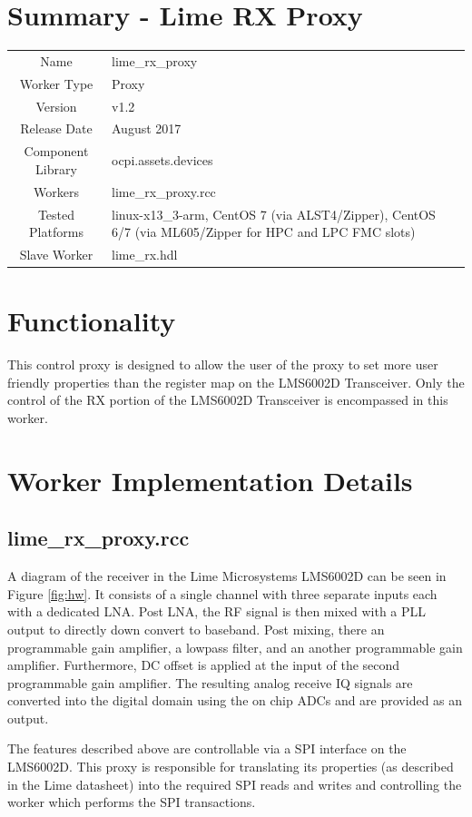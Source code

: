 \documentclass{article}
\author{} %
\date{Version \docVersion} %
\title{\docTitle}
\def\docVersion{1.2}
\def\comp{lime\_rx\_proxy}
\def\Comp{Lime RX Proxy}
\begin{document}
\section*{Summary - \Comp}
\begin{tabular}{|c|M{13.5cm}|}
	\hline
	                  &                \\
	\hline
	Name              & \comp          \\
	\hline
	Worker Type       & Proxy          \\
	\hline
	Version           & v\docVersion \\
	\hline
	Release Date      & August 2017 \\
	\hline
	Component Library & ocpi.assets.devices   \\
	\hline
	Workers           & \comp.rcc      \\
	\hline
	Tested Platforms  & linux-x13\_3-arm, CentOS 7 (via ALST4/Zipper), CentOS 6/7 (via ML605/Zipper for HPC and LPC FMC slots) \\
	\hline
	Slave Worker      & lime\_rx.hdl   \\
	\hline
\end{tabular}

\section*{Functionality}
This control proxy is designed to allow the user of the proxy to set more user friendly properties than the register map on the LMS6002D Transceiver.  Only the control of the RX portion of the LMS6002D Transceiver is encompassed in this worker.

\section*{Worker Implementation Details}
\subsection*{\comp.rcc}
A diagram of the receiver in the Lime Microsystems LMS6002D can be seen in Figure \ref{fig:hw}. It consists of a single channel with three separate inputs each with a dedicated LNA. Post LNA, the RF signal is then mixed with a PLL output to directly down convert to baseband. Post mixing, there an programmable gain amplifier, a lowpass filter, and an another programmable gain amplifier. Furthermore, DC offset is applied at the input of the second programmable gain amplifier. The resulting analog receive IQ signals are converted into the digital domain using the on chip ADCs and are provided as an output.\par\medskip
\noindent The features described above are controllable via a SPI interface on the LMS6002D. This proxy is responsible for translating its properties (as described in the Lime datasheet) into the required SPI reads and writes and controlling the worker which performs the SPI transactions.
\newpage
\end{document}
